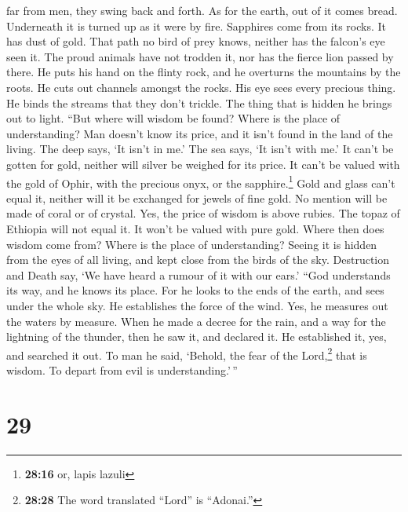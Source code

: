 far from men, they swing back and forth.  As for the
earth, out of it comes bread. Underneath it is turned up as it were by
fire.  Sapphires come from its rocks. It has dust of gold.
 That path no bird of prey knows, neither has the falcon's
eye seen it.  The proud animals have not trodden it, nor
has the fierce lion passed by there.  He puts his hand on
the flinty rock, and he overturns the mountains by the roots.
 He cuts out channels amongst the rocks. His eye sees
every precious thing.  He binds the streams that they
don't trickle. The thing that is hidden he brings out to light.
 ``But where will wisdom be found? Where is the place of
understanding?  Man doesn't know its price, and it isn't
found in the land of the living.  The deep says, `It
isn't in me.' The sea says, `It isn't with me.'  It can't
be gotten for gold, neither will silver be weighed for its price.
 It can't be valued with the gold of Ophir, with the
precious onyx, or the sapphire.\footnote{\textbf{28:16} or, lapis lazuli}
 Gold and glass can't equal it, neither will it be
exchanged for jewels of fine gold.  No mention will be
made of coral or of crystal. Yes, the price of wisdom is above rubies.
 The topaz of Ethiopia will not equal it. It won't be
valued with pure gold.  Where then does wisdom come from?
Where is the place of understanding?  Seeing it is hidden
from the eyes of all living, and kept close from the birds of the sky.
 Destruction and Death say, `We have heard a rumour of it
with our ears.'  ``God understands its way, and he knows
its place.  For he looks to the ends of the earth, and
sees under the whole sky.  He establishes the force of
the wind. Yes, he measures out the waters by measure. 
When he made a decree for the rain, and a way for the lightning of the
thunder,  then he saw it, and declared it. He established
it, yes, and searched it out.  To man he said, `Behold,
the fear of the Lord,\footnote{\textbf{28:28} The word translated
  ``Lord'' is ``Adonai.''} that is wisdom. To depart from evil is
understanding.'\,''

\hypertarget{section-21}{%
\section{29}\label{section-21}}

